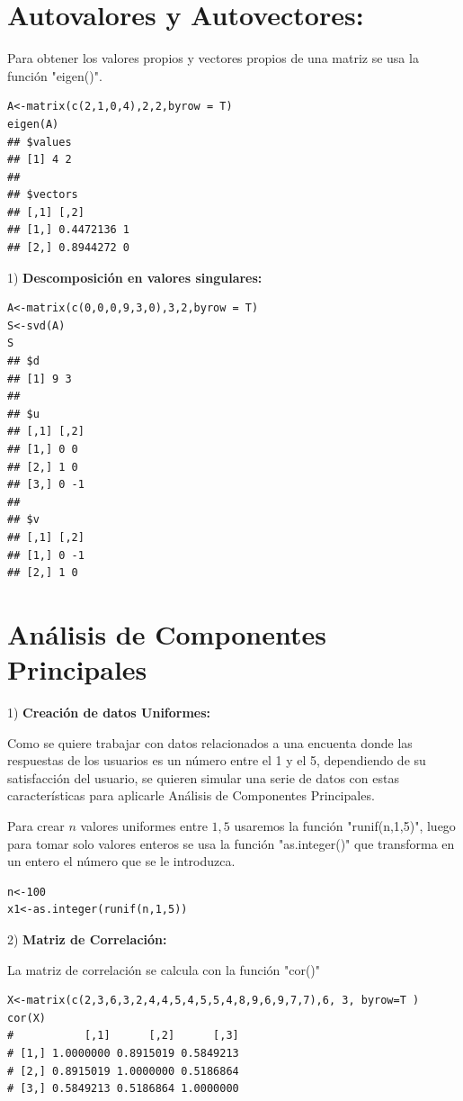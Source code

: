 \documentclass[12pt,letterpaper]{report} %
\begin{document}
\section{Autovalores y Autovectores:}

Para obtener los valores propios y vectores propios de una matriz se usa la función "eigen()".

\begin{lstlisting}
A<-matrix(c(2,1,0,4),2,2,byrow = T)
eigen(A)
## $values
## [1] 4 2
##
## $vectors
## [,1] [,2]
## [1,] 0.4472136 1
## [2,] 0.8944272 0
\end{lstlisting}

1) \textbf{Descomposición en valores singulares:}

\begin{lstlisting}
A<-matrix(c(0,0,0,9,3,0),3,2,byrow = T)
S<-svd(A)
S
## $d
## [1] 9 3
##
## $u
## [,1] [,2]
## [1,] 0 0
## [2,] 1 0
## [3,] 0 -1
##
## $v
## [,1] [,2]
## [1,] 0 -1
## [2,] 1 0
\end{lstlisting}

\section{Análisis de Componentes Principales}

1) \textbf{Creación de datos Uniformes:}

Como se quiere trabajar con datos relacionados a una encuenta donde las respuestas de los usuarios es un número entre el 1 y el 5, dependiendo de su satisfacción del usuario, se quieren simular una serie de datos con estas características para aplicarle Análisis de Componentes Principales.

Para crear $n$ valores uniformes entre $1,5$ usaremos la función "runif(n,1,5)", luego para tomar solo valores enteros se usa la función "as.integer()" que transforma en un entero el número que se le introduzca.

\begin{lstlisting}
n<-100
x1<-as.integer(runif(n,1,5))
\end{lstlisting}

2) \textbf{Matriz de Correlación:}

La matriz de correlación se calcula con la función "cor()"

\begin{lstlisting}
X<-matrix(c(2,3,6,3,2,4,4,5,4,5,5,4,8,9,6,9,7,7),6, 3, byrow=T )
cor(X)
#           [,1]      [,2]      [,3]
# [1,] 1.0000000 0.8915019 0.5849213
# [2,] 0.8915019 1.0000000 0.5186864
# [3,] 0.5849213 0.5186864 1.0000000
\end{lstlisting}
\end{document}
